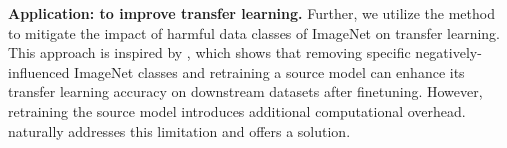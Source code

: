 {\noindent \textbf{Application: {\MU} to improve transfer learning.}
Further, we utilize the   {\MUSparse} method to mitigate the   impact of harmful data classes of   ImageNet    on transfer learning.  This approach is inspired by \citet{jain2022data}, which shows that  removing specific negatively-influenced ImageNet classes and retraining a source model  can enhance its transfer learning accuracy on    downstream   datasets  after finetuning. However, retraining the source model introduces additional computational overhead. {\MU} naturally addresses this limitation and offers a solution.



}
